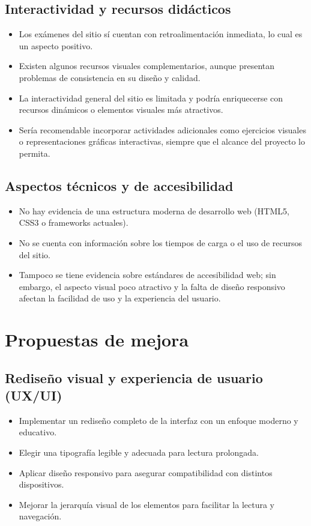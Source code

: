 \documentclass[11pt,a4paper]{article}
\begin{document}
\subsection{Interactividad y recursos did\'acticos}
\begin{itemize}[left=0pt,labelsep=5pt]
    \item Los ex\'amenes del sitio s\'i cuentan con retroalimentaci\'on inmediata, lo cual es un aspecto positivo.
    \item Existen algunos recursos visuales complementarios, aunque presentan problemas de consistencia en su dise\~no y calidad.
    \item La interactividad general del sitio es limitada y podr\'ia enriquecerse con recursos din\'amicos o elementos visuales m\'as atractivos.
    \item Ser\'ia recomendable incorporar actividades adicionales como ejercicios visuales o representaciones gr\'aficas interactivas, siempre que el alcance del proyecto lo permita.
\end{itemize}

\subsection{Aspectos t\'ecnicos y de accesibilidad}
\begin{itemize}[left=0pt,labelsep=5pt]
    \item No hay evidencia de una estructura moderna de desarrollo web (HTML5, CSS3 o frameworks actuales).
    \item No se cuenta con informaci\'on sobre los tiempos de carga o el uso de recursos del sitio.
    \item Tampoco se tiene evidencia sobre est\'andares de accesibilidad web; sin embargo, el aspecto visual poco atractivo y la falta de dise\~no responsivo afectan la facilidad de uso y la experiencia del usuario.
\end{itemize}

\section{Propuestas de mejora}

\subsection{Redise\~no visual y experiencia de usuario (UX/UI)}
\begin{itemize}[left=0pt,labelsep=5pt]
    \item Implementar un redise\~no completo de la interfaz con un enfoque moderno y educativo.
    \item Elegir una tipograf\'ia legible y adecuada para lectura prolongada.
    \item Aplicar dise\~no responsivo para asegurar compatibilidad con distintos dispositivos.
    \item Mejorar la jerarqu\'ia visual de los elementos para facilitar la lectura y navegaci\'on.
\end{itemize}
\end{document}
